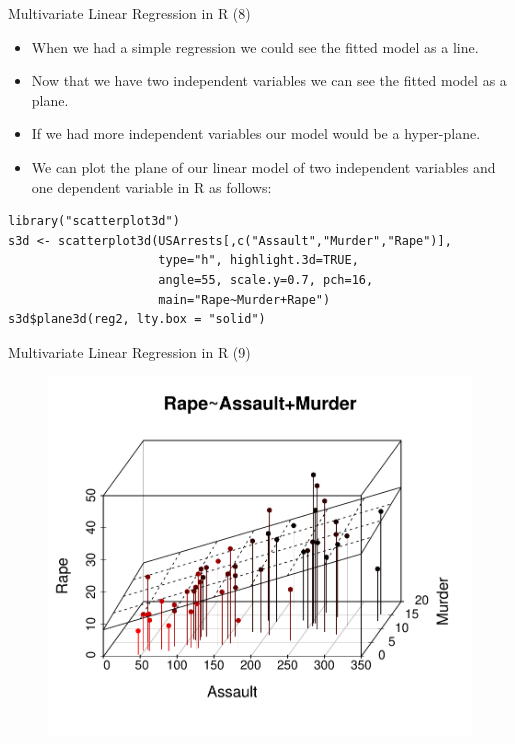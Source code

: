 \documentclass[handout]{beamer}
\begin{document}
\begin{frame}[fragile]{Multivariate Linear Regression in R (8)}
\scriptsize{
\begin{itemize}
 \item When we had a simple regression we could see the fitted model as a line.
 \item Now that we have two independent variables we can see the fitted model as a plane.
 \item If we had more independent variables our model would be a hyper-plane.
 \item We can plot the plane of our linear model of two independent variables and one dependent variable in R as follows:
 \end{itemize}

\begin{verbatim}
library("scatterplot3d")
s3d <- scatterplot3d(USArrests[,c("Assault","Murder","Rape")],
                     type="h", highlight.3d=TRUE,
                     angle=55, scale.y=0.7, pch=16, 
                     main="Rape~Murder+Rape")
s3d$plane3d(reg2, lty.box = "solid")

\end{verbatim}




} 
\end{frame}

\begin{frame}{Multivariate Linear Regression in R (9)}
 
\begin{figure}[h!]
	\centering
	\includegraphics[scale=0.6]{pics/reg3d.pdf}
\end{figure}
 
\end{frame}
\end{document}
